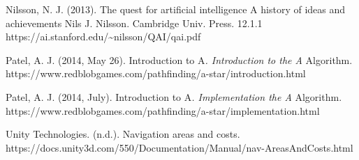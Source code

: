 \documentclass[11pt]{article}
\makeatletter
\newcommand{\boxspacing}{\kern\kvtcb@left@rule\kern\kvtcb@boxsep}
\newcommand{\prompt}[4]{
        {\ttfamily\llap{{\color{#2}[#3]:\hspace{3pt}#4}}\vspace{-\baselineskip}}
    }
\makeatother
\begin{document}
Nilsson, N. J. (2013). The quest for artificial intelligence A history
of ideas and achievements Nils J. Nilsson. Cambridge Univ. Press. 12.1.1
https://ai.stanford.edu/\textasciitilde nilsson/QAI/qai.pdf

Patel, A. J. (2014, May 26). Introduction to A\emph{. Introduction to
the A} Algorithm.
https://www.redblobgames.com/pathfinding/a-star/introduction.html

Patel, A. J. (2014, July). Introduction to A\emph{. Implementation the
A} Algorithm.
https://www.redblobgames.com/pathfinding/a-star/implementation.html

Unity Technologies. (n.d.). Navigation areas and costs.
https://docs.unity3d.com/550/Documentation/Manual/nav-AreasAndCosts.html

    \begin{tcolorbox}[breakable, size=fbox, boxrule=1pt, pad at break*=1mm,colback=cellbackground, colframe=cellborder]
\prompt{In}{incolor}{ }{\boxspacing}
\begin{Verbatim}[commandchars=\\\{\}]

\end{Verbatim}
\end{tcolorbox}


    
    
    
\end{document}
